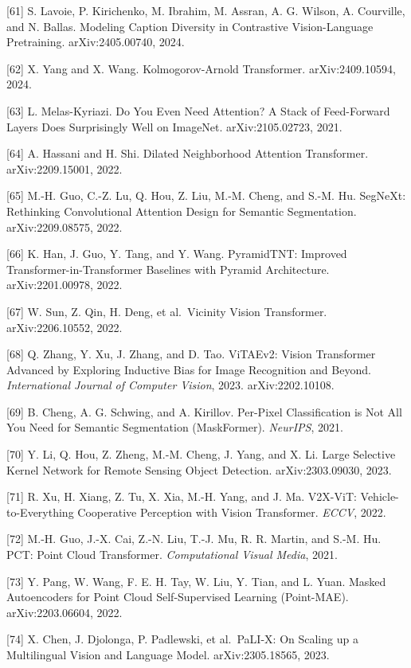 {[}61{]} S. Lavoie, P. Kirichenko, M. Ibrahim, M. Assran, A. G. Wilson, A. Courville, and N. Ballas. Modeling Caption Diversity in Contrastive Vision-Language Pretraining. arXiv:2405.00740, 2024.

{[}62{]} X. Yang and X. Wang. Kolmogorov-Arnold Transformer. arXiv:2409.10594, 2024.

{[}63{]} L. Melas-Kyriazi. Do You Even Need Attention? A Stack of Feed-Forward Layers Does Surprisingly Well on ImageNet. arXiv:2105.02723, 2021.

{[}64{]} A. Hassani and H. Shi. Dilated Neighborhood Attention Transformer. arXiv:2209.15001, 2022.

{[}65{]} M.-H. Guo, C.-Z. Lu, Q. Hou, Z. Liu, M.-M. Cheng, and S.-M. Hu. SegNeXt: Rethinking Convolutional Attention Design for Semantic Segmentation. arXiv:2209.08575, 2022.

{[}66{]} K. Han, J. Guo, Y. Tang, and Y. Wang. PyramidTNT: Improved Transformer-in-Transformer Baselines with Pyramid Architecture. arXiv:2201.00978, 2022.

{[}67{]} W. Sun, Z. Qin, H. Deng, et al.~Vicinity Vision Transformer. arXiv:2206.10552, 2022.

{[}68{]} Q. Zhang, Y. Xu, J. Zhang, and D. Tao. ViTAEv2: Vision Transformer Advanced by Exploring Inductive Bias for Image Recognition and Beyond. \emph{International Journal of Computer Vision}, 2023. arXiv:2202.10108.

{[}69{]} B. Cheng, A. G. Schwing, and A. Kirillov. Per-Pixel Classification is Not All You Need for Semantic Segmentation (MaskFormer). \emph{NeurIPS}, 2021.

{[}70{]} Y. Li, Q. Hou, Z. Zheng, M.-M. Cheng, J. Yang, and X. Li. Large Selective Kernel Network for Remote Sensing Object Detection. arXiv:2303.09030, 2023.

{[}71{]} R. Xu, H. Xiang, Z. Tu, X. Xia, M.-H. Yang, and J. Ma. V2X-ViT: Vehicle-to-Everything Cooperative Perception with Vision Transformer. \emph{ECCV}, 2022.

{[}72{]} M.-H. Guo, J.-X. Cai, Z.-N. Liu, T.-J. Mu, R. R. Martin, and S.-M. Hu. PCT: Point Cloud Transformer. \emph{Computational Visual Media}, 2021.

{[}73{]} Y. Pang, W. Wang, F. E. H. Tay, W. Liu, Y. Tian, and L. Yuan. Masked Autoencoders for Point Cloud Self-Supervised Learning (Point-MAE). arXiv:2203.06604, 2022.

{[}74{]} X. Chen, J. Djolonga, P. Padlewski, et al.~PaLI-X: On Scaling up a Multilingual Vision and Language Model. arXiv:2305.18565, 2023.


